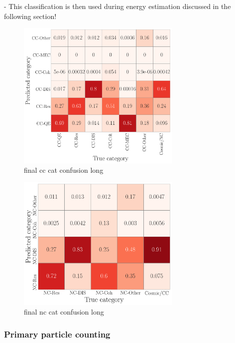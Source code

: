 - This classification is then used during energy estimation discussed in the following section!

\begin{figure} %
    \includegraphics[width=0.7\textwidth]{diagrams/6-cvn/chipsnet/final_cc_cat_confusion.pdf}
    \caption[final cc cat confusion short]
    {final cc cat confusion long}
    \label{fig:final_cc_cat_confusion}
\end{figure}

\begin{figure} %
    \includegraphics[width=0.7\textwidth]{diagrams/6-cvn/chipsnet/final_nc_cat_confusion.pdf}
    \caption[final nc cat confusion short]
    {final nc cat confusion long}
    \label{fig:final_nc_cat_confusion}
\end{figure}

\subsubsection*{Primary particle counting} %

